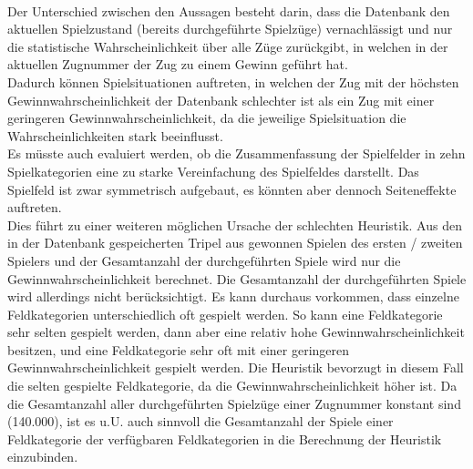 \\Der Unterschied zwischen den Aussagen besteht darin, dass die Datenbank den aktuellen Spielzustand (bereits durchgeführte Spielzüge) vernachlässigt und nur die statistische Wahrscheinlichkeit über alle Züge zurückgibt, in welchen in der aktuellen Zugnummer der Zug zu einem Gewinn geführt hat.
\\Dadurch können Spielsituationen auftreten, in welchen der Zug mit der höchsten Gewinnwahrscheinlichkeit der Datenbank schlechter ist als ein Zug mit einer geringeren Gewinnwahrscheinlichkeit, da die jeweilige Spielsituation die Wahrscheinlichkeiten stark beeinflusst.
\vspace{0.5cm}
\\Es müsste auch evaluiert werden, ob die Zusammenfassung der Spielfelder in zehn Spielkategorien eine zu starke Vereinfachung des Spielfeldes darstellt. Das Spielfeld ist zwar symmetrisch aufgebaut, es könnten aber dennoch Seiteneffekte auftreten.
\vspace{0.5cm}
\\Dies führt zu einer weiteren möglichen Ursache der schlechten Heuristik. Aus den in der Datenbank gespeicherten Tripel aus gewonnen Spielen des ersten / zweiten Spielers und der Gesamtanzahl der durchgeführten Spiele wird nur die Gewinnwahrscheinlichkeit berechnet. Die Gesamtanzahl der durchgeführten Spiele wird allerdings nicht berücksichtigt. Es kann durchaus vorkommen, dass einzelne Feldkategorien unterschiedlich oft gespielt werden. So kann eine Feldkategorie sehr selten gespielt werden, dann aber eine relativ hohe Gewinnwahrscheinlichkeit besitzen, und eine Feldkategorie sehr oft mit einer geringeren Gewinnwahrscheinlichkeit gespielt werden. Die Heuristik bevorzugt in diesem Fall die selten gespielte Feldkategorie, da die Gewinnwahrscheinlichkeit höher ist. Da die Gesamtanzahl aller durchgeführten Spielzüge einer Zugnummer konstant sind (140.000), ist es u.U. auch sinnvoll die Gesamtanzahl der Spiele einer Feldkategorie der verfügbaren Feldkategorien in die Berechnung der Heuristik einzubinden.

